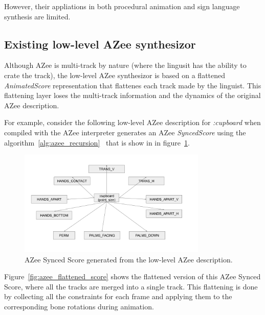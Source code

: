 \documentclass[../../main.tex]{subfiles}
\begin{document}
However, their appliations in both procedural animation and sign language synthesis are limited.



\subsection{Existing low-level AZee synthesizor}
\label{ch:multi_track:related_work:old_azee_synthesizor}

Although AZee is multi-track by nature (where the lingusit has the ability to crate the track), the low-level AZee synthesizor is based on a flattened \emph{AnimatedScore} representation that flattenes each track made by the linguist. This flattening layer loses the multi-track information and the dynamics of the original AZee description. 

For example, consider the following low-level AZee description for \emph{:cupboard} when compiled with the AZee interpreter generates an AZee \emph{SyncedScore} using the algorithm~\ref{alg:azee_recursion}~\cite{filhol2017synthesizing} that is show in in figure~\ref{fig:azee_synced_score}.

\begin{figure}[h]
    \centering
    \includegraphics[width=0.8\textwidth]{chapters/multi_track/images/azee_synced_score.png}
    \caption{AZee Synced Score generated from the low-level AZee description.}
    \label{fig:azee_synced_score}
\end{figure}

Figure~\ref{fig:azee_flattened_score} shows the flattened version of this AZee Synced Score, where all the tracks are merged into a single track. This flattening is done by collecting all the constraints for each frame and applying them to the corresponding bone rotations during animation.
\end{document}
